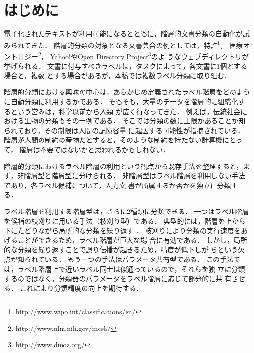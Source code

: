 \documentclass[japanese]{jnlp_1.4}
\begin{document}
\maketitle


\section{はじめに} \label{sec:introduction}

電子化されたテキストが利用可能になるとともに，階層的文書分類の自動化が試
みられてきた．
階層的分類の対象となる文書集合の例としては，特許\footnote{
	http://www.wipo.int/classifications/en/}，
医療オントロジー\footnote{
	http://www.nlm.nih.gov/mesh/}，
Yahoo!やOpen Directory Project\footnote{http://www.dmoz.org/}のよ
うなウェブディレクトリが挙げられる．
文書に付与すべきラベルは，タスクによって，各文書に1個とする場合と，複数
とする場合があるが，本稿では複数ラベル分類に取り組む．

階層的分類における興味の中心は，あらかじめ定義されたラベル階層をどのよう
に自動分類に利用するかである．
そもそも，大量のデータを階層的に組織化するという営みは，科学以前から人類
が広く行なってきた．
例えば，伝統社会における生物の分類もその一例である．
そこでは分類の数に上限があることが知られており，その制限は人間の記憶容量
に起因する可能性が指摘されている\cite{Berlin1992}．
階層が人間の制約の産物だとすると，そのような制約を持たない計算機にとって，
階層は不要ではないかと思われるかもしれない．

階層的分類におけるラベル階層の利用という観点から既存手法を整理すると，ま
ず，非階層型と階層型に分けられる．
非階層型はラベル階層を利用しない手法であり，各ラベル候補について，入力文
書が所属するか否かを独立に分類する．

ラベル階層を利用する階層型は，さらに2種類に分類できる．
一つはラベル階層を候補の枝刈りに用いる手法（枝刈り型）である．
典型的には，階層を上から下にたどりながら局所的な分類を繰り返す
\cite{Montejo2006,Qiu2009full,Wang2011IJCNLPfull}．
枝刈りにより分類の実行速度をあげることができるため，ラベル階層が巨大な場
合に有効である．
しかし，局所的な分類を繰り返すことで誤り伝播が起きるため，精度が低下しが
ちという欠点が知られている\cite{Bennett2009}．
もう一つの手法はパラメータ共有型である．
この手法では，ラベル階層上で近いラベル同士は似通っているので，それらを独
立に分類するのではなく，分類器のパラメータをラベル階層に応じて部分的に共
有させる\cite{Qiu2009full}．
これにより分類精度の向上を期待する．
\end{document}
